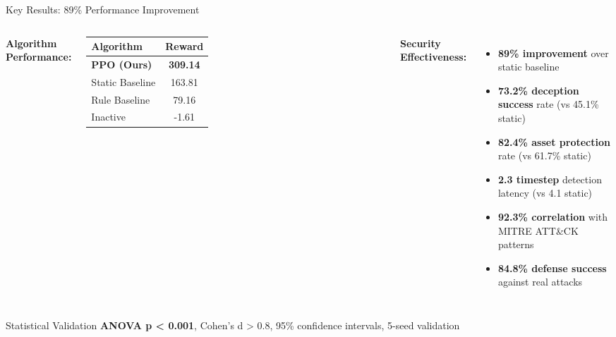 \documentclass[aspectratio=169,xcolor=dvipsnames]{beamer}
\begin{document}
\begin{frame}{Key Results: 89\% Performance Improvement}
\begin{columns}[c]
\textbf{\textcolor{ImperialBlue}{Algorithm Performance:}}

\centering
\begin{tabular}{|l|c|}
\hline
\rowcolor{ImperialLightBlue}
\textbf{Algorithm} & \textbf{Reward} \\
\hline
\rowcolor{green!20}
\textbf{PPO (Ours)} & \textbf{309.14} \\
Static Baseline & 163.81 \\
Rule Baseline & 79.16 \\
Inactive & -1.61 \\
\hline
\end{tabular}


\textbf{\textcolor{cwAlert}{Security Effectiveness:}}
\begin{itemize}
    \item \textbf{\textcolor{cwAlert}{89\% improvement}} over static baseline
    \item \textbf{73.2\% deception success} rate (vs 45.1\% static)
    \item \textbf{82.4\% asset protection} rate (vs 61.7\% static)
    \item \textbf{2.3 timestep} detection latency (vs 4.1 static)
    \item \textbf{92.3\% correlation} with MITRE ATT\&CK patterns
    \item \textbf{84.8\% defense success} against real attacks
\end{itemize}
\end{columns}

\vspace{0.3cm}
\begin{exampleblock}{Statistical Validation}
\textbf{ANOVA p < 0.001}, Cohen's d > 0.8, 95\% confidence intervals, 5-seed validation
\end{exampleblock}
\end{frame}
\end{document}
